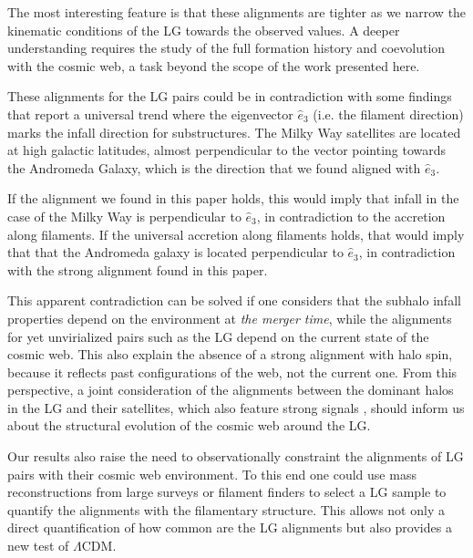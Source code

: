 \documentclass{emulateapj}
\begin{document}
The most interesting feature is that these alignments are
tighter as we narrow the kinematic conditions of the LG towards the
observed values. A deeper understanding requires the study of the full
formation history and coevolution with the cosmic web, a task beyond
the scope of the work presented here.

These alignments for the LG pairs could be in contradiction with
some findings
\citep{2005ApJ...629..219Z,2008MNRAS.390.1133B,2014MNRAS.443.1274L}
that report a universal trend where the eigenvector $\hat{e}_{3}$
(i.e. the filament direction) marks the infall direction for
substructures. The Milky Way satellites are located at high
galactic latitudes, almost perpendicular to the vector pointing
towards the Andromeda Galaxy, which is the direction that we found aligned with
$\hat{e}_3$.  

If the alignment we found in this paper holds, this would imply that
infall in the case of the Milky Way is perpendicular to $\hat{e}_3$,
in contradiction to the accretion along filaments. If the universal accretion
along filaments holds, that would imply that that the Andromeda
galaxy is located perpendicular to $\hat{e}_3$, in contradiction with the strong
alignment found in this paper.  

This apparent contradiction can be solved if one considers that the
subhalo infall properties depend on the environment at {\it the
  merger time}, while the alignments for yet unvirialized pairs such as the LG
depend on the current state of the cosmic web. This also explain the absence
of a strong alignment with halo spin, because it reflects past
configurations of the web, not the current one. From this perspective,
a joint consideration of the alignments between the dominant
halos in the LG and their satellites, which also feature strong
signals \citep{2005A&A...431..517K,2013ApJ...766..120C}, should
inform us about the structural evolution of the cosmic web around the
LG.    

Our results also raise the need to observationally constraint
the alignments of LG pairs with their cosmic web environment. To this end
one could use mass reconstructions from large surveys
\citep{2009MNRAS.394..398W,2011MNRAS.417.1303M,2014arXiv1407.3451W,2014arXiv1406.1004N}
or filament finders \citep{2010MNRAS.407.1449G,2011MNRAS.414..350S}
to select a LG sample to quantify the alignments with the filamentary
structure. 
This allows not only a direct quantification of how common are the LG
alignments but also provides a new test of $\Lambda$CDM. 
\end{document}
